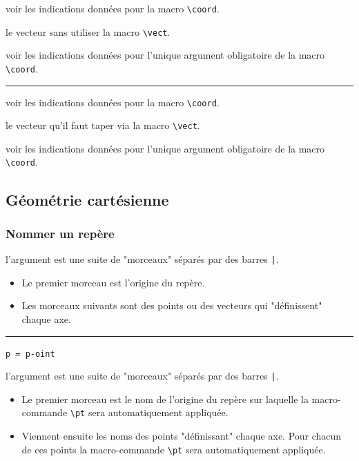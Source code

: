 \documentclass[12pt,a4paper]{book}
\newcommand\env[1]{\texttt{#1}}
\newcommand\macro[1]{\env{\textbackslash{}#1}}
\theoremstyle{definition}
\newcommand\separation{
	\medskip
	\hfill\rule{0.5\textwidth}{0.75pt}\hfill
	\medskip
}
\newcommand\mwhyprefix[2]{%
	\texttt{#1 = #1-#2}%
}
\begin{document}
{{\IDoption{} voir les indications données pour la macro \macro{coord}.

 le vecteur sans utiliser la macro \macro{vect}.

 voir les indications données pour l'unique argument obligatoire de la macro \macro{coord}.


\separation



\IDoption{} voir les indications données pour la macro \macro{coord}.

 le vecteur qu'il faut taper via la macro \macro{vect}.

 voir les indications données pour l'unique argument obligatoire de la macro \macro{coord}.


\subsection{Géométrie cartésienne}

\subsubsection{Nommer un repère}





\IDarg{} l'argument est une suite de "morceaux" séparés par des barres \verb+|+.

\begin{itemize}[topsep=0pt]
	\item Le premier morceau est l'origine du repère.

	\item Les morceaux suivants sont des points ou des vecteurs qui "définissent" chaque axe.
\end{itemize}


\separation

 \hfill \mwhyprefix{p}{oint}

\IDarg{} l'argument est une suite de "morceaux" séparés par des barres \verb+|+.

\begin{itemize}[topsep=0pt]
	\item Le premier morceau est le nom de l'origine du repère sur laquelle la macro-commande \macro{pt} sera automatiquement appliquée.

	\item Viennent ensuite les noms des points "définissant" chaque axe. Pour chacun de ces points la macro-commande \macro{pt} sera automatiquement appliquée.
\end{itemize}


}}
\end{document}
